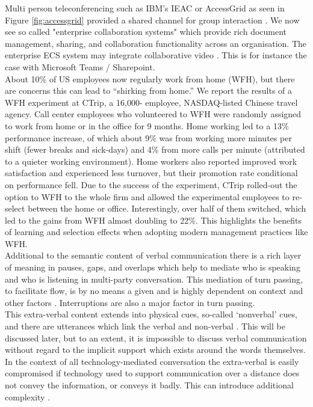 Multi person teleconferencing such as IBM's IEAC or AccessGrid as seen in Figure \ref{fig:accessgrid} provided a shared channel for group interaction \cite{Ding2007}. We now see so called "enterprise collaboration systems" which provide rich document management, sharing, and collaboration functionality across an organisation. The enterprise ECS system may integrate collaborative video \cite{prakash2020characteristic}. This is for instance the case with Microsoft Teams / Sharepoint.\\
About 10\% of US employees now regularly work from home (WFH), but there are concerns this can lead to “shirking from home.” We report the results of a WFH experiment at CTrip, a 16,000- employee, NASDAQ-listed Chinese travel agency. Call center employees who volunteered to WFH were randomly assigned to work from home or in the office for 9 months. Home working led to a 13\% performance increase, of which about 9\% was from working more minutes per shift (fewer breaks and sick-days) and 4\% from more calls per minute (attributed to a quieter working environment). Home workers also reported improved work satisfaction and experienced less turnover, but their promotion rate conditional on performance fell. Due to the success of the experiment, CTrip rolled-out the option to WFH to the whole firm and allowed the experimental employees to re-select between the home or office. Interestingly, over half of them switched, which led to the gains from WFH almost doubling to 22\%. This highlights the benefits of learning and selection effects when adopting modern management practices like WFH.\\
Additional to the semantic content of verbal communication there is a rich layer of meaning in pauses, gaps, and overlaps \cite{Heldner2010} which help to mediate who is speaking and who is listening in multi-party conversation. This mediation of turn passing, to facilitate flow, is by no means a given and is highly dependent on context and other factors \cite{Kleinke1986a}. Interruptions are also a major factor in turn passing.\\
This extra-verbal content \cite{ting2012understanding} extends into physical cues, so-called `nonverbal' cues, and there are utterances which link the verbal and non-verbal \cite{Otsuka2005}. This will be discussed later, but to an extent, it is impossible to discuss verbal communication without regard to the implicit support which exists around the words themselves.\\
In the context of all technology-mediated conversation the extra-verbal is easily compromised if technology used to support communication over a distance does not convey the information, or conveys it badly. This can introduce additional complexity \cite{Otsuka2005}.\\

